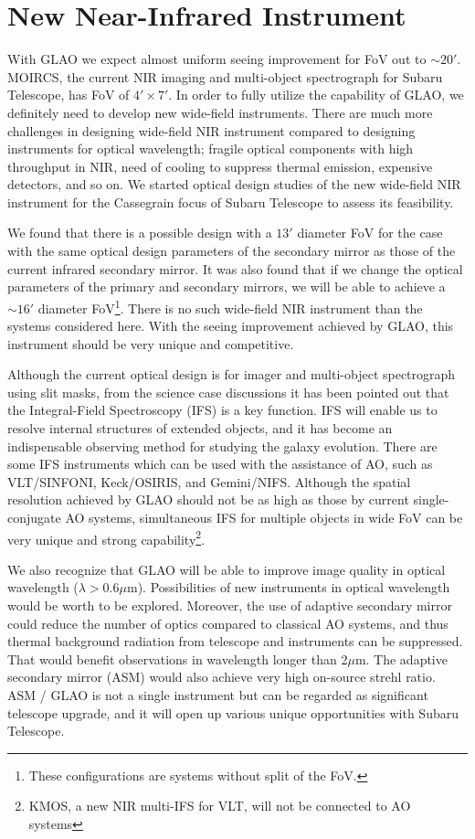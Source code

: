 \section{New Near-Infrared Instrument}

With GLAO we expect almost uniform seeing improvement for FoV out to
$\sim 20'$. MOIRCS, the current NIR imaging and multi-object
spectrograph for Subaru Telescope, has FoV of $4' \times 7'$. In order
to fully utilize the capability of GLAO, we definitely need to develop
new wide-field instruments. There are much more challenges in designing 
wide-field NIR instrument compared to designing instruments for
optical wavelength; fragile optical components with high throughput in
NIR, need of cooling to suppress thermal emission, expensive
detectors, and so on. We started optical design studies of the new
wide-field NIR instrument for the Cassegrain focus of Subaru
Telescope to assess its feasibility. %

We found that there is a possible design with a $13'$ diameter FoV for
the case with the same optical design parameters of the secondary
mirror as those of the current infrared secondary mirror. It was also 
found that if we change the optical parameters of the primary and 
secondary mirrors, we will be able to achieve a $\sim 16'$ diameter
FoV\footnote{These configurations are systems without split of the
FoV.}.
There is no such wide-field NIR instrument than the systems
considered here. With the seeing improvement achieved by GLAO, this 
instrument should be very unique and competitive.

Although the current optical design is for imager and multi-object
spectrograph using slit masks, from the science case discussions it has
been pointed out that the Integral-Field Spectroscopy (IFS) is a key
function. IFS will enable us to resolve internal structures of extended
objects, and it has become an indispensable observing method for
studying the galaxy evolution.
There are some IFS instruments which can be used with the assistance of
AO, such as VLT/SINFONI, Keck/OSIRIS, and Gemini/NIFS.
Although the spatial resolution achieved by GLAO should not be as high
as those by current single-conjugate AO systems, simultaneous IFS for
multiple objects in wide FoV can be very unique and strong
capability\footnote{KMOS, a new NIR multi-IFS for VLT, will not be
connected to AO systems}.

We also recognize that GLAO will be able to improve image quality in
optical wavelength ($\lambda > 0.6 \mu$m). Possibilities of new
instruments in optical wavelength would be worth to be
explored. Moreover, the use of adaptive secondary mirror could reduce
the number of optics compared to classical AO systems, and thus thermal
background radiation from telescope and instruments can be
suppressed. That would benefit observations in wavelength longer than 
2$\mu$m. The adaptive secondary mirror (ASM) would also achieve very
high on-source strehl ratio. ASM / GLAO is not a single instrument but
can be regarded as significant telescope upgrade, and it will open up
various unique opportunities with Subaru Telescope.

